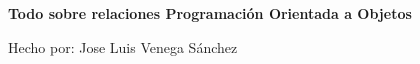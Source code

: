 \thispagestyle{empty}
\begin{center}
\vspace*{\fill}
	\textbf{\huge \vspace*{0.1in} Todo sobre relaciones Programación Orientada a Objetos}
\vspace*{\fill}

\vspace{1in}
Hecho por: Jose Luis Venega Sánchez
\end{center}
